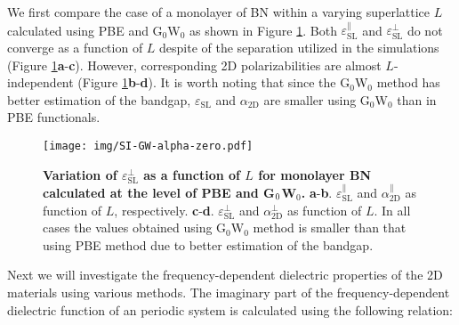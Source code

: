 \documentclass[manuscript=suppinfo,email=true,hyperref=true,keywords=false]{achemso}
\begin{document}

We first compare the case of a monolayer of BN within a varying
superlattice $L$ calculated using PBE and G$_{0}$W$_{0}$ as shown in
Figure \ref{fig:GW-PBE-alpha}.  Both
$\varepsilon_{\mathrm{SL}}^{\parallel}$ and
$\varepsilon_{\mathrm{SL}}^{\perp}$ do not converge as a function of
$L$ despite of the separation utilized in the simulations (Figure
\ref{fig:GW-PBE-alpha}{\bf a}-{\bf c}). However, corresponding 2D
polarizabilities are almost $L$-independent (Figure
\ref{fig:GW-PBE-alpha}{\bf b}-{\bf d}). It is worth noting that since
the G$_{0}$W$_{0}$ method has better estimation of the bandgap,
$\varepsilon_{\mathrm{SL}}$ and $\alpha_{\mathrm{2D}}$ are smaller
using G$_{0}$W$_{0}$ than in PBE functionals.
\begin{figure}[htbp]
  \centering
 \texttt{[image: img/SI-GW-alpha-zero.pdf]}
 \caption{{\bf Variation of 
   $\varepsilon^{\perp}_{\mathrm{SL}}$ as a function of $L$ for
   monolayer BN calculated at the level of PBE and G$_{\rm 0}$W$_{0}$.}
   \textbf{a}-{\bf b}. $\varepsilon_{\mathrm{SL}}^{\parallel}$ and $\alpha_{\mathrm{2D}}^{\parallel}$ as function of $L$, respectively.    
  \textbf{c}-{\bf d}. $\varepsilon_{\mathrm{SL}}^{\perp}$ and 
  $\alpha_{\mathrm{2D}}^{\perp}$ as
   function of $L$. 
   In all cases the values obtained using
   G$_{0}$W$_{0}$ method is smaller than that using PBE method due to
   better estimation of the bandgap.}
  \label{fig:GW-PBE-alpha}
\end{figure}

Next we will investigate the frequency-dependent dielectric properties of the 2D materials using various methods. The imaginary part of the frequency-dependent dielectric function of an periodic system is calculated using the following relation:
\end{document}
